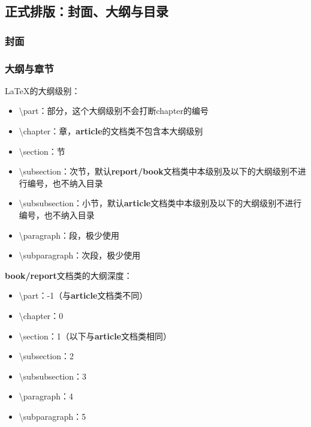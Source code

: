 \documentclass[twoside]{ctexart}
\begin{document}
    \subsection{正式排版：封面、大纲与目录}
        \subsubsection{封面}
        \subsubsection{大纲与章节}
            \LaTeX 的大纲级别：

            \begin{itemize}
                \item \textbackslash part：部分，这个大纲级别不会打断chapter的编号
                \item \textbackslash chapter：章，\textbf{article}的文档类不包含本大纲级别
                \item \textbackslash section：节
                \item \textbackslash subsection：次节，默认\textbf{report/book}文档类中本级别及以下的大纲级别不进行编号，也不纳入目录
                \item \textbackslash subsubsection：小节，默认\textbf{article}文档类中本级别及以下的大纲级别不进行编号，也不纳入目录
                \item \textbackslash paragraph：段，极少使用
                \item \textbackslash subparagraph：次段，极少使用
            \end{itemize}

            \textbf{book/report}文档类的大纲深度：

            \begin{itemize}
                \item \textbackslash part：-1（与\textbf{article}文档类不同）
                \item \textbackslash chapter：0
                \item \textbackslash section：1（以下与\textbf{article}文档类相同）
                \item \textbackslash subsection：2
                \item \textbackslash subsubsection：3
                \item \textbackslash paragraph：4
                \item \textbackslash subparagraph：5
            \end{itemize}
\end{document}
